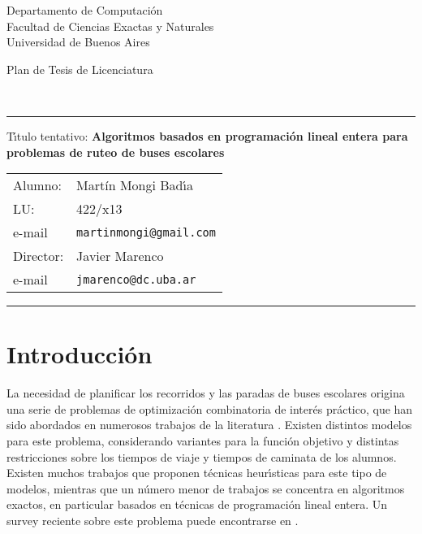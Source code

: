 \documentclass[11pt, a4paper]{article}
\begin{document}
\begin{center}
Departamento de Computaci\'on \\
Facultad de Ciencias Exactas y Naturales \\
Universidad de Buenos Aires \\[11pt]

\begin{Large}
Plan de Tesis de Licenciatura
\end{Large} \\
\end{center}

\vskip 11pt

\hrule

\vskip 11pt

T\'\i tulo tentativo: \textbf{Algoritmos basados en programaci\'on lineal entera para problemas de ruteo de buses escolares}

\hspace*{-0.35cm} \begin{tabular}{ll}
Alumno:     & Mart\'in Mongi Bad\'\i a \\
LU:         & 422/x13 \\
e-mail      & \texttt{martinmongi@gmail.com} \\[11pt]
Director:   & Javier Marenco \\
e-mail      & \texttt{jmarenco@dc.uba.ar} \\
\end{tabular}

\vskip 11pt

\hrule

\vskip 11pt

\section{Introducci\'on}

La necesidad de planificar los recorridos y las paradas de buses escolares origina una serie de problemas de optimizaci\'on combinatoria de inter\'es pr\'actico, que han sido abordados en numerosos trabajos de la literatura \cite{park10}. Existen distintos modelos para este problema, considerando variantes para la funci\'on objetivo y distintas restricciones sobre los tiempos de viaje y tiempos de caminata de los alumnos. Existen muchos trabajos que proponen t\'ecnicas heur\'\i sticas para este tipo de modelos, mientras que un n\'umero menor de trabajos se concentra en algoritmos exactos, en particular basados en t\'ecnicas de programaci\'on lineal entera. Un survey reciente sobre este problema puede encontrarse en \cite{campbell19}.
\end{document}
